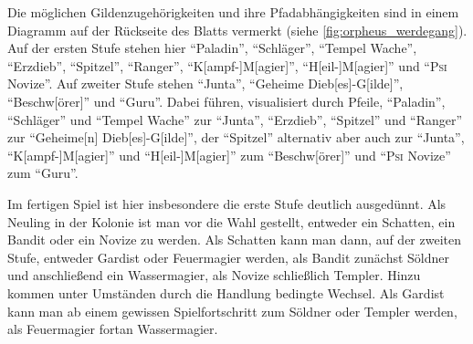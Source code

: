 \documentclass[a5paper,pagesize,numbers=noenddot]{scrbook}
\begin{document}
Die möglichen Gildenzugehörigkeiten und ihre Pfadabhängigkeiten sind in einem Diagramm auf der Rückseite des Blatts vermerkt (siehe \autoref{fig:orpheus_werdegang}). %
Auf der ersten Stufe stehen hier \enquote{Paladin}, \enquote{Schläger}, \enquote{Tempel Wache}, \enquote{Erzdieb}, \enquote{Spitzel}, \enquote{Ranger}, \enquote{K[ampf-]M[agier]}, \enquote{H[eil-]M[agier]} und \enquote{\textsc{Psi} Novize}.
Auf zweiter Stufe stehen \enquote{Junta}, \enquote{Geheime Dieb[es]-G[ilde]}, \enquote{Beschw[örer]} und \enquote{Guru}.
Dabei führen, visualisiert durch Pfeile, \enquote{Paladin}, \enquote{Schläger} und \enquote{Tempel Wache} zur \enquote{Junta}, \enquote{Erzdieb}, \enquote{Spitzel} und \enquote{Ranger} zur \enquote{Geheime[n] Dieb[es]-G[ilde]}, der \enquote{Spitzel} alternativ aber auch zur \enquote{Junta}, \enquote{K[ampf-]M[agier]} und \enquote{H[eil-]M[agier]} zum \enquote{Beschw[örer]} und \enquote{\textsc{Psi} Novize} zum \enquote{Guru}.

Im fertigen Spiel ist hier insbesondere die erste Stufe deutlich ausgedünnt.
Als Neuling in der Kolonie ist man vor die Wahl gestellt, entweder ein Schatten, ein Bandit oder ein Novize zu werden.
Als Schatten kann man dann, auf der zweiten Stufe, entweder Gardist oder Feuermagier werden, als Bandit zunächst Söldner und anschließend ein Wassermagier, als Novize schließlich Templer.
Hinzu kommen unter Umständen durch die Handlung bedingte Wechsel.
Als Gardist kann man ab einem gewissen Spielfortschritt zum Söldner oder Templer werden, als Feuermagier fortan Wassermagier.
\end{document}
